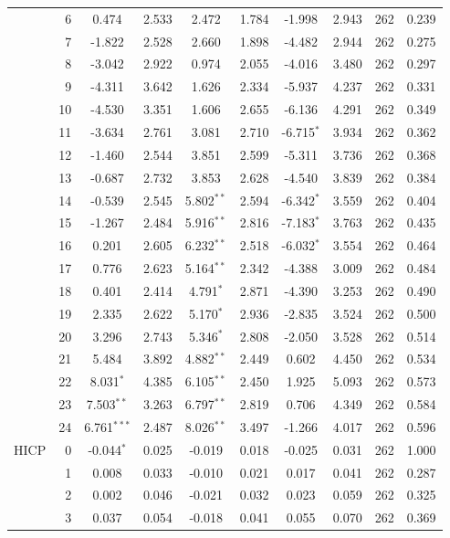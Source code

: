 \begin{longtable}[t]{lrcccccccc}
 & 6 & 0.474 & 2.533 & 2.472 & 1.784 & -1.998 & 2.943 & 262 & 0.239\\
 & 7 & -1.822 & 2.528 & 2.660 & 1.898 & -4.482 & 2.944 & 262 & 0.275\\
 & 8 & -3.042 & 2.922 & 0.974 & 2.055 & -4.016 & 3.480 & 262 & 0.297\\
 & 9 & -4.311 & 3.642 & 1.626 & 2.334 & -5.937 & 4.237 & 262 & 0.331\\
 & 10 & -4.530 & 3.351 & 1.606 & 2.655 & -6.136 & 4.291 & 262 & 0.349\\
 & 11 & -3.634 & 2.761 & 3.081 & 2.710 & -6.715$^{*}$ & 3.934 & 262 & 0.362\\
 & 12 & -1.460 & 2.544 & 3.851 & 2.599 & -5.311 & 3.736 & 262 & 0.368\\
 & 13 & -0.687 & 2.732 & 3.853 & 2.628 & -4.540 & 3.839 & 262 & 0.384\\
 & 14 & -0.539 & 2.545 & 5.802$^{**}$ & 2.594 & -6.342$^{*}$ & 3.559 & 262 & 0.404\\
 & 15 & -1.267 & 2.484 & 5.916$^{**}$ & 2.816 & -7.183$^{*}$ & 3.763 & 262 & 0.435\\
 & 16 & 0.201 & 2.605 & 6.232$^{**}$ & 2.518 & -6.032$^{*}$ & 3.554 & 262 & 0.464\\
 & 17 & 0.776 & 2.623 & 5.164$^{**}$ & 2.342 & -4.388 & 3.009 & 262 & 0.484\\
 & 18 & 0.401 & 2.414 & 4.791$^{*}$ & 2.871 & -4.390 & 3.253 & 262 & 0.490\\
 & 19 & 2.335 & 2.622 & 5.170$^{*}$ & 2.936 & -2.835 & 3.524 & 262 & 0.500\\
 & 20 & 3.296 & 2.743 & 5.346$^{*}$ & 2.808 & -2.050 & 3.528 & 262 & 0.514\\
 & 21 & 5.484 & 3.892 & 4.882$^{**}$ & 2.449 & 0.602 & 4.450 & 262 & 0.534\\
 & 22 & 8.031$^{*}$ & 4.385 & 6.105$^{**}$ & 2.450 & 1.925 & 5.093 & 262 & 0.573\\
 & 23 & 7.503$^{**}$ & 3.263 & 6.797$^{**}$ & 2.819 & 0.706 & 4.349 & 262 & 0.584\\
 & 24 & 6.761$^{***}$ & 2.487 & 8.026$^{**}$ & 3.497 & -1.266 & 4.017 & 262 & 0.596\\
\midrule
HICP & 0 & -0.044$^{*}$ & 0.025 & -0.019 & 0.018 & -0.025 & 0.031 & 262 & 1.000\\
 & 1 & 0.008 & 0.033 & -0.010 & 0.021 & 0.017 & 0.041 & 262 & 0.287\\
 & 2 & 0.002 & 0.046 & -0.021 & 0.032 & 0.023 & 0.059 & 262 & 0.325\\
 & 3 & 0.037 & 0.054 & -0.018 & 0.041 & 0.055 & 0.070 & 262 & 0.369\\

\end{longtable}
